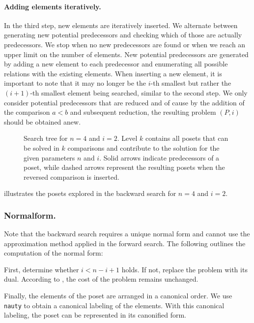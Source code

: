 \documentclass[twoside,leqno,twocolumn]{article}
\begin{document}
\paragraph{Adding elements iteratively.}
In the third step, new elements are iteratively inserted.
We alternate between generating new potential predecessors and checking which of those are actually predecessors.
We stop when no new predecessors are found or when we reach an upper limit on the number of elements.
New potential predecessors are generated by adding a new element to each predecessor and enumerating all possible relations with the existing elements.
When inserting a new element, it is important to note that it may no longer be the $i$-th smallest but rather the $(i + 1)$-th smallest element being searched, similar to the second step.
We only consider potential predecessors that are reduced and of cause by the addition of the comparison $a < b$ and subsequent reduction, the resulting problem $(P, i)$ should be obtained anew.

\begin{figure}[!b]
  \centering
  
  \caption{Search tree for $n = 4$ and $i = 2$.
    Level $k$ contains all posets that can be solved in $k$ comparisons and contribute to the solution for the given parameters $n$ and $i$.
    Solid arrows indicate predecessors of a poset, while dashed arrows represent the resulting posets when the reversed comparison is inserted.}
  \label{fig:backward-search-tree}
\end{figure}

 illustrates the posets explored in the backward search for $n = 4$ and $i = 2$.

\subsubsection{Normalform.} \label{sec:backward:normal_form}
Note that the backward search requires a unique normal form and cannot use the approximation method applied in the forward search.
The following outlines the computation of the normal form:

First, determine whether $i < n - i + 1$ holds.
If not, replace the problem with its dual.
According to , the cost of the problem remains unchanged.

Finally, the elements of the poset are arranged in a canonical order.
We use \texttt{nauty} to obtain a canonical labeling of the elements.
With this canonical labeling, the poset can be represented in its canonified form.
\end{document}

